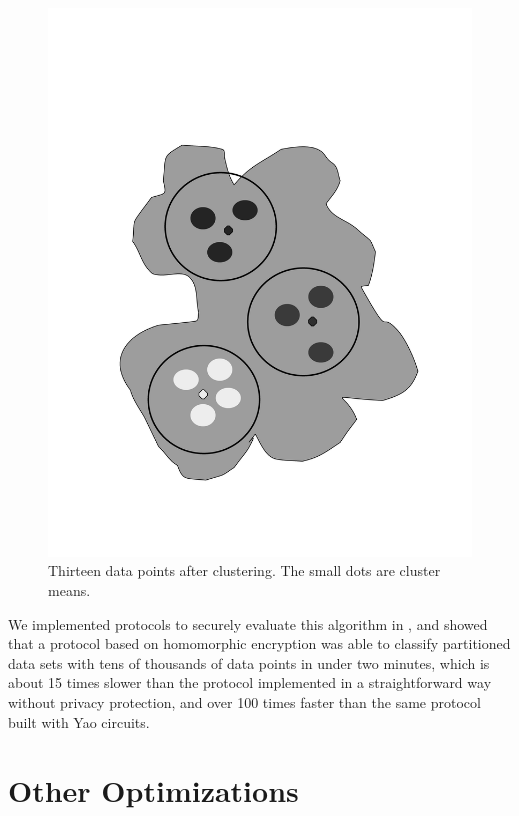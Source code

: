 %
\begin{figure}
\includegraphics[scale=0.3,angle=270]{clusters}

\caption{\label{fig:clusters}Thirteen data points after clustering. The small
dots are cluster means.}

\end{figure}


We implemented protocols to securely evaluate this algorithm in \cite{kruger05},
and showed that a protocol based on homomorphic encryption was able
to classify partitioned data sets with tens of thousands of data points
in under two minutes, which is about 15 times slower than the protocol
implemented in a straightforward way without privacy protection, and
over 100 times faster than the same protocol built with Yao circuits.


\section{Other Optimizations}\label{sub:Other-Optimizations}

